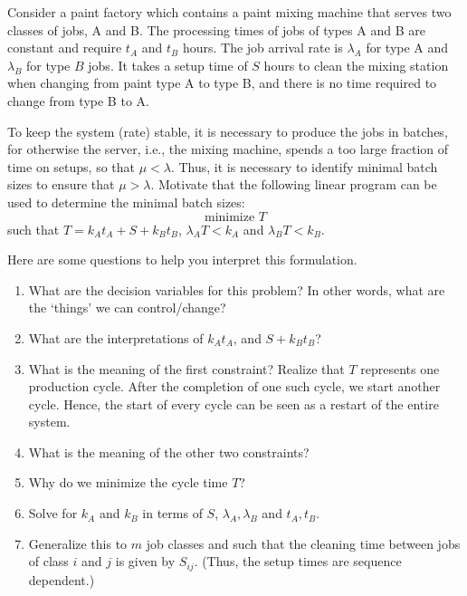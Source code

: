 \begin{exercise}[\faPhoto]
  Consider a paint factory which contains a paint mixing machine that
  serves two classes of jobs, A and B. The processing times of jobs of
  types A and B are constant and require $t_A$ and $t_B$ hours. The
  job arrival rate is $\lambda_A$ for type A and $\lambda_B$ for type
  $B$ jobs. It takes a setup time of $S$ hours to clean the mixing
  station when changing from paint type A to type B, and there is no
  time required to change from type B to A.

  To keep the system (rate) stable, it is necessary to produce the
  jobs in batches, for otherwise the server, i.e., the mixing machine,
  spends a too large fraction of time on setups, so that
  $\mu < \lambda$. Thus, it is necessary to identify minimal batch
  sizes to ensure that $\mu > \lambda$.  Motivate that the following linear
  program  can be used to determine the minimal batch sizes:
\begin{equation*}
  \text{minimize }  T
\end{equation*}
such that $ T=  k_A t_A + S + k_B t_B$, $\lambda_A T < k_A$ and $\lambda_B T < k_B$.
\begin{hint}
Here are some questions to help you interpret this formulation.
\begin{enumerate}
\item   What are the decision variables for this problem? In other words, what are the `things' we can control/change?
\item What are the interpretations of $k_A t_A$, and $S+k_B t_B$?
\item What is the meaning of the first constraint?  Realize that $T$
  represents one production cycle. After the completion of one such
  cycle, we start another cycle. Hence, the start of every cycle can
  be seen as a restart of the entire system.
\item   What is the meaning of the other two constraints?
\item Why do we minimize the cycle time $T$?
\item Solve for $k_A$ and $k_B$ in terms of $S$,  $\lambda_A, \lambda_B$ and $t_A, t_B$. 
\item Generalize this to $m$ job classes and such that the cleaning
  time between jobs of class $i$ and $j$ is given by $S_{i j}$. (Thus,
  the setup times are sequence dependent.) 
\end{enumerate}
\end{hint}


\end{exercise}
